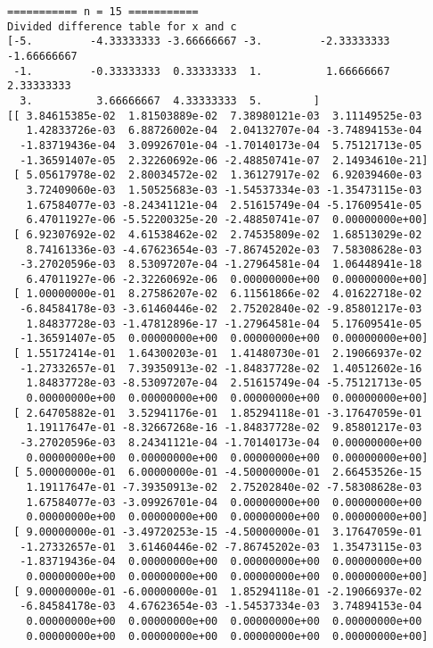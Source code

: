 \documentclass[11pt]{article}
\begin{document}
\begin{Verbatim}[commandchars=\\\{\}]
=========== n = 15 ===========
Divided difference table for x and c
[-5.         -4.33333333 -3.66666667 -3.         -2.33333333 -1.66666667
 -1.         -0.33333333  0.33333333  1.          1.66666667  2.33333333
  3.          3.66666667  4.33333333  5.        ]
[[ 3.84615385e-02  1.81503889e-02  7.38980121e-03  3.11149525e-03
   1.42833726e-03  6.88726002e-04  2.04132707e-04 -3.74894153e-04
  -1.83719436e-04  3.09926701e-04 -1.70140173e-04  5.75121713e-05
  -1.36591407e-05  2.32260692e-06 -2.48850741e-07  2.14934610e-21]
 [ 5.05617978e-02  2.80034572e-02  1.36127917e-02  6.92039460e-03
   3.72409060e-03  1.50525683e-03 -1.54537334e-03 -1.35473115e-03
   1.67584077e-03 -8.24341121e-04  2.51615749e-04 -5.17609541e-05
   6.47011927e-06 -5.52200325e-20 -2.48850741e-07  0.00000000e+00]
 [ 6.92307692e-02  4.61538462e-02  2.74535809e-02  1.68513029e-02
   8.74161336e-03 -4.67623654e-03 -7.86745202e-03  7.58308628e-03
  -3.27020596e-03  8.53097207e-04 -1.27964581e-04  1.06448941e-18
   6.47011927e-06 -2.32260692e-06  0.00000000e+00  0.00000000e+00]
 [ 1.00000000e-01  8.27586207e-02  6.11561866e-02  4.01622718e-02
  -6.84584178e-03 -3.61460446e-02  2.75202840e-02 -9.85801217e-03
   1.84837728e-03 -1.47812896e-17 -1.27964581e-04  5.17609541e-05
  -1.36591407e-05  0.00000000e+00  0.00000000e+00  0.00000000e+00]
 [ 1.55172414e-01  1.64300203e-01  1.41480730e-01  2.19066937e-02
  -1.27332657e-01  7.39350913e-02 -1.84837728e-02  1.40512602e-16
   1.84837728e-03 -8.53097207e-04  2.51615749e-04 -5.75121713e-05
   0.00000000e+00  0.00000000e+00  0.00000000e+00  0.00000000e+00]
 [ 2.64705882e-01  3.52941176e-01  1.85294118e-01 -3.17647059e-01
   1.19117647e-01 -8.32667268e-16 -1.84837728e-02  9.85801217e-03
  -3.27020596e-03  8.24341121e-04 -1.70140173e-04  0.00000000e+00
   0.00000000e+00  0.00000000e+00  0.00000000e+00  0.00000000e+00]
 [ 5.00000000e-01  6.00000000e-01 -4.50000000e-01  2.66453526e-15
   1.19117647e-01 -7.39350913e-02  2.75202840e-02 -7.58308628e-03
   1.67584077e-03 -3.09926701e-04  0.00000000e+00  0.00000000e+00
   0.00000000e+00  0.00000000e+00  0.00000000e+00  0.00000000e+00]
 [ 9.00000000e-01 -3.49720253e-15 -4.50000000e-01  3.17647059e-01
  -1.27332657e-01  3.61460446e-02 -7.86745202e-03  1.35473115e-03
  -1.83719436e-04  0.00000000e+00  0.00000000e+00  0.00000000e+00
   0.00000000e+00  0.00000000e+00  0.00000000e+00  0.00000000e+00]
 [ 9.00000000e-01 -6.00000000e-01  1.85294118e-01 -2.19066937e-02
  -6.84584178e-03  4.67623654e-03 -1.54537334e-03  3.74894153e-04
   0.00000000e+00  0.00000000e+00  0.00000000e+00  0.00000000e+00
   0.00000000e+00  0.00000000e+00  0.00000000e+00  0.00000000e+00]

\end{Verbatim}
\end{document}
